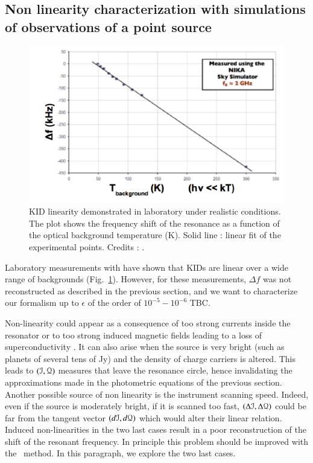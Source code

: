 
\subsection{Non linearity characterization with simulations of observations of a point source}

\begin{figure}
\center
\includegraphics[clip, angle=0, width=\columnwidth]{Figures/KID-linearity-Monfardini2014.png}
\caption{KID linearity demonstrated in laboratory under realistic
  conditions. The plot shows the frequency shift of the resonance as a function
  of the optical background temperature (K). Solid line : linear fit of the
  experimental points. Credits : \citet{2014JLTP..176..787M}.}
\label{fig:KID-lin}
\end{figure}

Laboratory measurements with  have shown that
KIDs are linear over a wide range of backgrounds (Fig.~\ref{fig:KID-lin}). However, for these measurements, $\Delta f$ was not reconstructed as described in the previous section, and we want to characterize our formalism up to $\epsilon$ of the order of $10^{-5}-10^{-6} $ TBC.

Non-linearity could appear as a consequence of too strong currents inside the resonator or to too strong induced magnetic fields leading to a loss of superconductivity \citep{Calvo2008} . It can also arise when the source is very bright (such as planets of several tens of Jy) and the density of charge carriers is altered. This leads to $(\mathcal{I},\mathcal{Q})$ measures that leave the resonance circle, hence invalidating the approximations made in the photometric equations of the previous section. 
Another possible source of non linearity is the instrument scanning speed. Indeed, even if the source is moderately bright, if it is scanned too fast, $(\Delta\mathcal{I},\Delta\mathcal{Q})$ could be far from the tangent vector $(d\mathcal{I},d\mathcal{Q})$ which would alter their linear relation. Induced non-linearities in the two last cases result in a poor reconstruction of the shift of the resonant frequency. In principle this problem should be improved with the \cf\ method. In this paragraph, we explore the two last cases.\\

